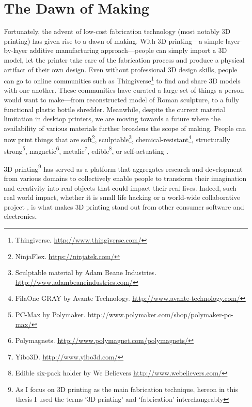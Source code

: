 \section{The Dawn of Making}
Fortunately, the advent of low-cost fabrication technology (most notably 3D printing) has given rise to a dawn of making. With 3D printing---a simple layer-by-layer additive manufacturing approach---people can simply import a 3D model, let the printer take care of the fabrication process and produce a physical artifact of their own design. Even without professional 3D design skills, people can go to online communities such as Thingiverse\footnote{Thingiverse. \url{http://www.thingiverse.com/}} to find and share 3D models with one another. These communities have curated a large set of things a person would want to make---from reconstructed model of Roman sculpture, to a fully functional plastic bottle shredder. Meanwhile, despite the current material limitation in desktop printers, we are moving towards a future where the availability of various materials further broadens the scope of making. People can now print things that are soft\footnote{NinjaFlex. \url{https://ninjatek.com/}}, sculptable\footnote{Sculptable material by Adam Beane Industries. \url{http://www.adambeaneindustries.com/}}, chemical-resistant\footnote{FilaOne GRAY by Avante Technology. \url{http://www.avante-technology.com/}}, structurally strong\footnote{PC-Max by Polymaker. \url{http://www.polymaker.com/shop/polymaker-pc-max/}}, magnetic\footnote{Polymagnets. \url{http://www.polymagnet.com/polymagnets/}}, metalic\footnote{Yibo3D. \url{http://www.yibo3d.com/}}, edible\footnote{Edible six-pack holder by We Believers \url{http://www.webelievers.com/}}, or self-actuating \cite{maccurdy2015printable}.

3D printing\footnote{As I focus on 3D printing as the main fabrication technique, hereon in this thesis I used the terms `3D printing' and `fabrication' interchangeably} has served as a platform that aggregates research and development from various domains to collectively enable people to transform their imagination and creativity into real objects that could impact their real lives. Indeed, such real world impact, whether it is small life hacking or a world-wide collaborative project \cite{schull2015enabling}, is what makes 3D printing stand out from other consumer software and electronics.


